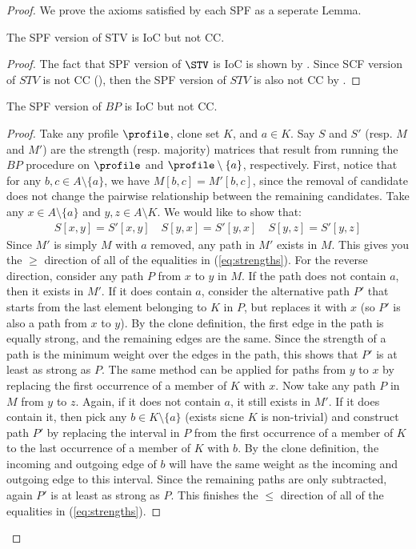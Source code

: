 \spftaxonomy*

\begin{proof}
We prove the axioms satisfied by each SPF as a seperate Lemma. 
\begin{lemma}\label{lemma:spfstv}
    The SPF version of STV is IoC but not CC.
\end{lemma}
\begin{proof} 

The fact that SPF version of $\STV$ is IoC is shown by \citet{Freeman14:Axiomatic}. Since SCF version of $STV$ is not CC (), then the SPF version of $STV$ is also not CC by .
\end{proof}

\begin{lemma}\label{lemma:spfbp}
    The SPF version of $BP$ is IoC but not CC.
\end{lemma}
\begin{proof} 

 Take any profile $\profile$, clone set $K$, and $a\in K$. Say $S$ and $S'$ (resp. $M$ and $M'$) are the strength (resp. majority) matrices that result from running the $BP$ procedure on $\profile$ and $\profile\setminus\{a\}$, respectively. First, notice that for any $b,c \in A \setminus \{a\}$, we have $M[b,c] =M'[b,c]$, since the removal of candidate does not change the pairwise relationship between the remaining candidates. Take any $x \in A\setminus\{a\}$ and $y,z \in A \setminus K$. We would like to show that:
 \begin{align}
     S[x,y]=S'[x,y] \quad   S[y,x]=S'[y,x] \quad S[y,z]=S'[y,z]  \label{eq:strengths}
 \end{align}
 Since $M'$ is simply $M$ with $a$ removed, any path in $M'$ exists in $M$. This gives you the $\geq$ direction of all of the equalities in (\ref{eq:strengths}). For the reverse direction, consider any path $P$ from $x$ to $y$ in $M$. If the path does not contain $a$, then it exists in $M'$. If it does contain $a$, consider the alternative path $P'$ that starts from the last element belonging to $K$ in $P$, but replaces it with $x$ (so $P'$ is also a path from $x$ to $y$). By the clone definition, the first edge in the path is equally strong, and the remaining edges are the same. Since the strength of a path is the minimum weight over the edges in the path, this shows that $P'$ is at least as strong as $P$. The same method can be applied for paths from $y$ to $x$ by replacing the first occurrence of a member of $K$ with $x$. Now take any path $P$ in $M$ from $y$ to $z$. Again, if it does not contain $a$, it still exists in $M'$. If it does contain it, then pick any $b \in K \setminus \{a\}$ (exists sicne $K$ is non-trivial) and construct path $P'$ by replacing the interval in $P$ from the first occurrence of a member of $K$ to the last occurrence of a member of $K$ with $b$. By the clone definition, the incoming and outgoing edge of $b$ will have the same weight as the incoming and outgoing edge to this interval. Since the remaining paths are only subtracted, again $P'$ is at least as strong as $P$. This finishes the  $\leq$ direction of all of the equalities in (\ref{eq:strengths}). 


\end{proof}
\end{proof}
